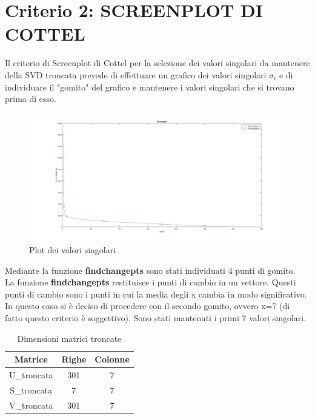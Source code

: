 \section{Criterio 2: SCREENPLOT DI COTTEL}

Il criterio di Screenplot di Cottel per la selezione dei valori singolari da mantenere della SVD troncata prevede di effettuare un grafico dei valori singolari $\sigma_i$ e di individuare il "gomito" del grafico e mantenere i valori singolari che si trovano prima di esso.\\

\begin{figure}[H]
    \centering
     \includegraphics[width=\textwidth]{images/plot.jpg}
    \caption{Plot dei valori singolari}
\end{figure}

\noindent Mediante la funzione \textbf{findchangepts} sono stati individuati 4 punti di gomito.\\
La funzione \textbf{findchangepts} restituisce i punti di cambio in un vettore. Questi punti di cambio sono i punti in cui la media degli x cambia in modo significativo.\\



\noindent In questo caso si è deciso di procedere con il secondo gomito, ovvero x=7 (di fatto questo criterio è soggettivo).
Sono stati mantenuti i primi 7 valori singolari.\\
\begin{table}[H]
    \centering
    \begin{tabular}{|c|c|c|}
        \hline
        \textbf{Matrice} & \textbf{Righe} & \textbf{Colonne} \\
        \hline
        U\_troncata & 301 & 7 \\
        \hline
        S\_troncata & 7 & 7 \\
        \hline
        V\_troncata & 301 & 7 \\
        \hline
    \end{tabular}
    \caption{Dimensioni matrici troncate}
\end{table}

